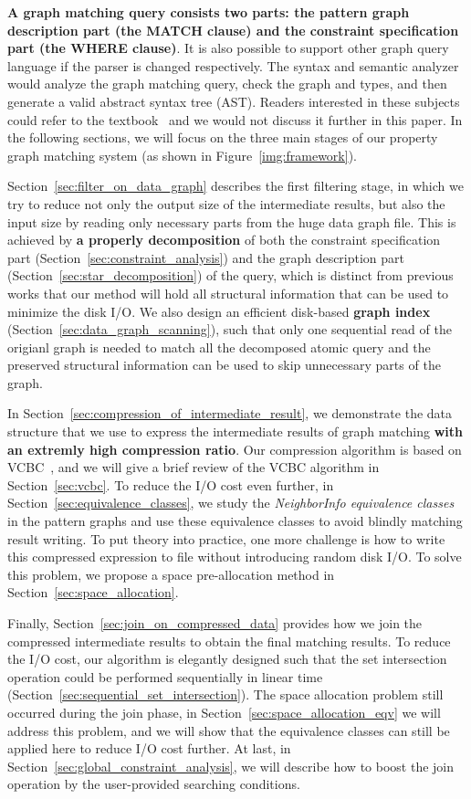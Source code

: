 \textbf{A graph matching query consists two parts: the pattern graph description part (the MATCH clause) and the constraint specification part (the WHERE clause)}.
It is also possible to support other graph query language if the parser is changed respectively.
The syntax and semantic analyzer would analyze the graph matching query,
check the graph and types, and then generate a valid abstract syntax tree (AST).
Readers interested in these subjects could refer to the textbook~\cite{friedman2001essentials} and we would not discuss it further in this paper.
In the following sections, we will focus on the three main stages of our property graph matching system (as shown in Figure~\ref{img:framework}).

Section~\ref{sec:filter_on_data_graph} describes the first filtering stage, in which we try to reduce not only the output size of the intermediate results,
but also the input size by reading only necessary parts from the huge data graph ﬁle.
This is achieved by \textbf{a properly decomposition} of both the constraint speciﬁcation part (Section~\ref{sec:constraint_analysis})
and the graph description part (Section~\ref{sec:star_decomposition}) of the query,
which is distinct from previous works that our method will hold all structural information that can be used to minimize the disk I/O.
We also design an efficient disk-based \textbf{graph index} (Section~\ref{sec:data_graph_scanning}), such that only one sequential read of the origianl
graph is needed to match all the decomposed atomic query and the preserved structural information
can be used to skip unnecessary parts of the graph.

In Section~\ref{sec:compression_of_intermediate_result}, we demonstrate the data structure that we use to express the intermediate results of graph matching
\textbf{with an extremly high compression ratio}.
Our compression algorithm is based on VCBC~\cite{DBLP:journals/pvldb/QiaoZC17}, and we will give a brief review of the VCBC algorithm in Section~\ref{sec:vcbc}.
To reduce the I/O cost even further, in Section~\ref{sec:equivalence_classes}, we study the \emph{NeighborInfo equivalence classes} in the pattern graphs and use
these equivalence classes to avoid blindly matching result writing. To put theory into practice, one more challenge
is how to write this compressed expression to file without introducing random disk I/O.
To solve this problem, we propose a space pre-allocation method in Section~\ref{sec:space_allocation}.

Finally, Section~\ref{sec:join_on_compressed_data} provides how we join the compressed intermediate results to obtain the
final matching results. To reduce the I/O cost, our algorithm is elegantly designed such that the set intersection
operation could be performed sequentially in linear time (Section~\ref{sec:sequential_set_intersection}).
The space allocation problem still occurred during the join phase, in Section~\ref{sec:space_allocation_eqv} we will address this problem,
and we will show that the equivalence classes can still be applied here to reduce I/O cost further.
At last, in Section~\ref{sec:global_constraint_analysis}, we will describe how to boost the join operation by the user-provided searching conditions.
